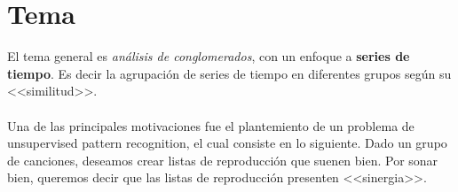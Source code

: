 \documentclass[12pt,oneside]{book}
\begin{document}
\section{Tema}
El tema general es \textit{an\'alisis de conglomerados}, con un enfoque a \textbf{series de tiempo}. Es decir la agrupaci\'on de series de tiempo en diferentes grupos seg\'un su <<similitud>>. 
\\\\
Una de las principales motivaciones fue el plantemiento de un problema de unsupervised pattern recognition, el cual consiste en lo siguiente. Dado un grupo de canciones, deseamos crear listas de reproducci\'on que suenen bien. Por sonar bien, queremos decir que las listas de reproducci\'on presenten <<sinergia>>.
\\\\
\end{document}
